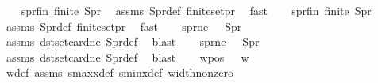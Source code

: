 \begin{isabellebody}
\isanewline
\ \ \isamarkupfalse%
\ s{}pr{\isacharunderscore}{\kern0pt}fin{\isacharcolon}{\kern0pt}\ {\isachardoublequoteopen}finite\ S{}pr{\isachardoublequoteclose}\ \isamarkupfalse%
\ assms{\isacharparenleft}{\kern0pt}{}{\isacharparenright}{\kern0pt}\ S{}pr{\isacharunderscore}{\kern0pt}def\ finite{\isacharunderscore}{\kern0pt}set{\isacharunderscore}{\kern0pt}pr\ \isamarkupfalse%
\ fast\isanewline
\ \ \isamarkupfalse%
\ s{}pr{\isacharunderscore}{\kern0pt}fin{\isacharcolon}{\kern0pt}\ {\isachardoublequoteopen}finite\ S{}pr{\isachardoublequoteclose}\ \isamarkupfalse%
\ assms{\isacharparenleft}{\kern0pt}{}{\isacharparenright}{\kern0pt}\ S{}pr{\isacharunderscore}{\kern0pt}def\ finite{\isacharunderscore}{\kern0pt}set{\isacharunderscore}{\kern0pt}pr\ \isamarkupfalse%
\ fast\isanewline
\ \ \isamarkupfalse%
\ s{}pr{\isacharunderscore}{\kern0pt}ne{\isacharcolon}{\kern0pt}\ \ \ {\isachardoublequoteopen}S{}pr\ {\isasymnoteq}\ {\isacharbraceleft}{\kern0pt}{\isacharbraceright}{\kern0pt}{\isachardoublequoteclose}\ \isamarkupfalse%
\ assms{\isacharparenleft}{\kern0pt}{}{\isacharcomma}{\kern0pt}{}{\isacharparenright}{\kern0pt}\ dst{\isacharunderscore}{\kern0pt}set{\isacharunderscore}{\kern0pt}card{}{\isacharunderscore}{\kern0pt}ne\ S{}pr{\isacharunderscore}{\kern0pt}def\ \isamarkupfalse%
\ blast\isanewline
\ \ \isamarkupfalse%
\ s{}pr{\isacharunderscore}{\kern0pt}ne{\isacharcolon}{\kern0pt}\ \ \ {\isachardoublequoteopen}S{}pr\ {\isasymnoteq}\ {\isacharbraceleft}{\kern0pt}{\isacharbraceright}{\kern0pt}{\isachardoublequoteclose}\ \isamarkupfalse%
\ assms{\isacharparenleft}{\kern0pt}{}{\isacharcomma}{\kern0pt}{}{\isacharparenright}{\kern0pt}\ dst{\isacharunderscore}{\kern0pt}set{\isacharunderscore}{\kern0pt}card{}{\isacharunderscore}{\kern0pt}ne\ S{}pr{\isacharunderscore}{\kern0pt}def\ \isamarkupfalse%
\ blast\isanewline
\isanewline
\ \ \isamarkupfalse%
\ w{}{\isacharunderscore}{\kern0pt}pos\ \ {\isacharcolon}{\kern0pt}\ {\isachardoublequoteopen}w{}\ {\isasymge}\ {}{\isachardoublequoteclose}\ \isamarkupfalse%
\ w{}{\isacharunderscore}{\kern0pt}def\ assms{\isacharparenleft}{\kern0pt}{}{\isacharcomma}{\kern0pt}{}{\isacharparenright}{\kern0pt}\ s{}{\isacharunderscore}{\kern0pt}maxx{\isacharunderscore}{\kern0pt}def\ s{}{\isacharunderscore}{\kern0pt}minx{\isacharunderscore}{\kern0pt}def\ width{\isacharunderscore}{\kern0pt}non{\isacharunderscore}{\kern0pt}zero\isanewline

\end{isabellebody}
